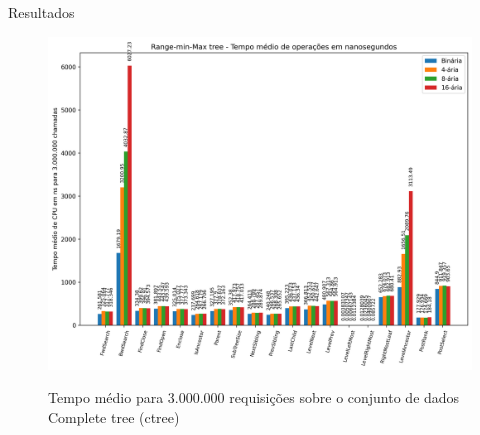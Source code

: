 \begin{frame}{Resultados}  
    \begin{figure}[h!]
        \centering
        \includegraphics[scale=0.35]{images/ctree_i3000000.png}\\
        \caption{Tempo médio para $3.000.000$ requisições sobre o conjunto de dados Complete tree (ctree)}
    \end{figure} 
\end{frame}
